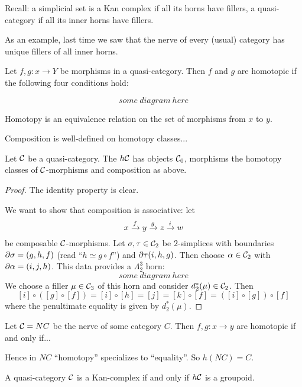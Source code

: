

Recall: a simplicial set is a Kan complex if all its horns have fillers, a quasi-category if all its inner horns have fillers.

As an example, last time we saw that the nerve of every (usual) category has unique fillers of all inner horns.

Let $f,g:x\to Y$ be morphisms in a quasi-category. Then $f$ and $g$ are homotopic if the following four conditions hold:

\[some\ diagram\ here\]

Homotopy is an equivalence relation on the set of morphisms from $x$ to $y$.

Composition is well-defined on homotopy classes...

\begin{thmdef}
Let $\mathcal{C}$ be a quasi-category. The  $h\mathcal{C}$ has objects $\mathcal{C}_0$, morphisms the homotopy classes of $\mathcal{C}$-morphisms and composition as above.
\end{thmdef}

\begin{proof}
The identity property is clear.

We want to show that composition is associative: let
\[x\xrightarrow{f}y\xrightarrow{g}z\xrightarrow{i}w\]
be composable $\mathcal{C}$-morphisms. Let $\sigma,\tau\in\mathcal{C}_2$ be $2$-simplices with boundaries $\partial\sigma=(g,h,f)$ (read \enquote{$h\simeq g\circ f$}) and $\partial\tau(i,h,g)$. Then choose $\alpha\in\mathcal{C}_2$ with $\partial\alpha=(i,j,h)$. This data provides a $\Lambda^3_2$ horn:
\[some\ diagram\ here\]
We choose a filler $\mu\in\mathcal{C}_3$ of this horn and consider $d_2^*(\mu)\in\mathcal{C}_2$. Then
\[[i]\circ([g]\circ[f])=[i]\circ[h]=[j]=[k]\circ[f]=([i]\circ[g])\circ[f]\]
where the penultimate equality is given by $d_2^*(\mu)$.
\end{proof}

\begin{example}
Let $\mathcal{C}=NC$ be the nerve of some category $C$. Then $f,g:x\to y$ are homotopic if and only if...

Hence in $NC$ \enquote{homotopy} specializes to \enquote{equality}. So $h(NC)=C$.
\end{example}

\begin{theorem}[Joyal]
A quasi-category $\mathcal{C}$ is a Kan-complex if and only if $h\mathcal{C}$ is a groupoid.
\end{theorem}


